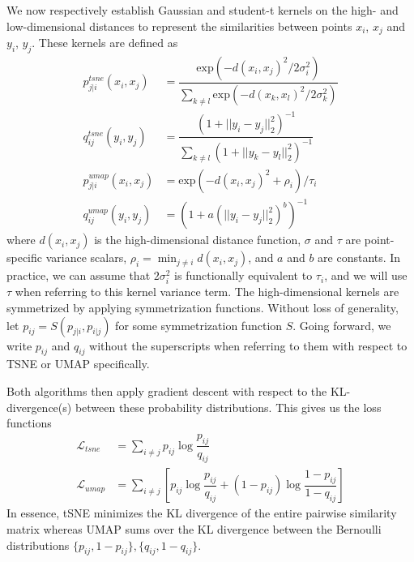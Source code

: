 \documentclass[sigconf, nonacm]{acmart}
\begin{document}
We now respectively establish Gaussian and student-t kernels on the high- and low-dimensional distances to represent the similarities between points $x_i$,
$x_j$ and $y_i$, $y_j$. These kernels are defined as
\begin{align}
    p^{tsne}_{j|i}(x_i, x_j) &= \dfrac{\text{exp}(-d(x_i, x_j)^2 / 2 \sigma_i^2)}{\sum_{k \neq l} \text{exp}(-d(x_k, x_l)^2 / 2 \sigma_k^2)} \\[0.5ex]
    q^{tsne}_{ij}(y_i, y_j) &= \dfrac{(1 + ||y_i - y_j||^2_2)^{-1}}{\sum_{k \neq l} (1 + ||y_k - y_l||^2_2)^{-1}} \\[1.5ex]
    p^{umap}_{j|i}(x_i, x_j) &= \text{exp} (-d(x_i, x_j)^2 + \rho_{i}) /\tau_i \\[0.3ex]
    q^{umap}_{ij}(y_i, y_j) &= \left( 1 + a(||y_i - y_j||^2_2)^b \right) ^{-1}
\end{align}
where $d(x_i, x_j)$ is the high-dimensional distance function, $\sigma$ and $\tau$ are point-specific variance scalars, $\rho_i = \min_{j \neq i} d(x_i, x_j)$,
and $a$ and $b$ are constants. In practice, we can assume that $2 \sigma_i^2$ is functionally equivalent to $\tau_i$, and we will use $\tau$ when referring to
this kernel variance term. The high-dimensional kernels are symmetrized by applying symmetrization functions. Without loss of generality, let $p_{ij}
= S(p_{j|i}, p_{i|j})$ for some symmetrization function $S$. Going forward, we write $p_{ij}$ and $q_{ij}$ without the superscripts when referring to them with
respect to TSNE or UMAP specifically.

Both algorithms then apply gradient descent with respect to the KL-divergence(s) between these probability distributions.
This gives us the loss functions
\begin{align}
    \mathcal{L}_{tsne} &= \sum_{i \neq j} p_{ij} \log \dfrac{p_{ij}}{q_{ij}} \\
    \mathcal{L}_{umap} &= \sum_{i \neq j} \left[ p_{ij} \log \dfrac{p_{ij}}{q_{ij}} + (1 - p_{ij}) \log \dfrac{1 - p_{ij}}{1 - q_{ij}} \right]
\end{align}
In essence, tSNE minimizes the KL divergence of the entire pairwise similarity matrix whereas UMAP sums over the KL divergence between the Bernoulli
distributions $\{p_{ij}, 1-p_{ij}\}, \{q_{ij}, 1 - q_{ij}\}$.
\end{document}
